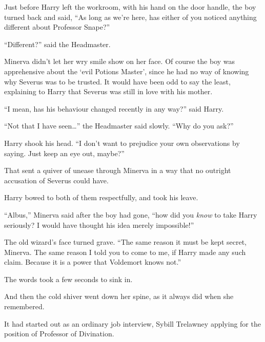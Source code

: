 Just before Harry left the workroom, with his hand on the door handle, the boy turned back and said, “As long as we’re here, has either of you noticed anything different about Professor Snape?”

“Different?” said the Headmaster.

Minerva didn’t let her wry smile show on her face. Of course the boy was apprehensive about the ‘evil Potions Master’, since he had no way of knowing why Severus was to be trusted. It would have been odd to say the least, explaining to Harry that Severus was still in love with his mother.

“I mean, has his behaviour changed recently in any way?” said Harry.

“Not that I have seen…” the Headmaster said slowly. “Why do you ask?”

Harry shook his head. “I don’t want to prejudice your own observations by saying. Just keep an eye out, maybe?”

That sent a quiver of unease through Minerva in a way that no outright accusation of Severus could have.

Harry bowed to both of them respectfully, and took his leave.

\later

“Albus,” Minerva said after the boy had gone, “how did you \emph{know} to take Harry seriously? I would have thought his idea merely impossible!”

The old wizard’s face turned grave. “The same reason it must be kept secret, Minerva. The same reason I told you to come to me, if Harry made any such claim. Because it is a power that Voldemort knows not.”

The words took a few seconds to sink in.

And then the cold shiver went down her spine, as it always did when she remembered.

It had started out as an ordinary job interview, Sybill Trelawney applying for the position of Professor of Divination.


